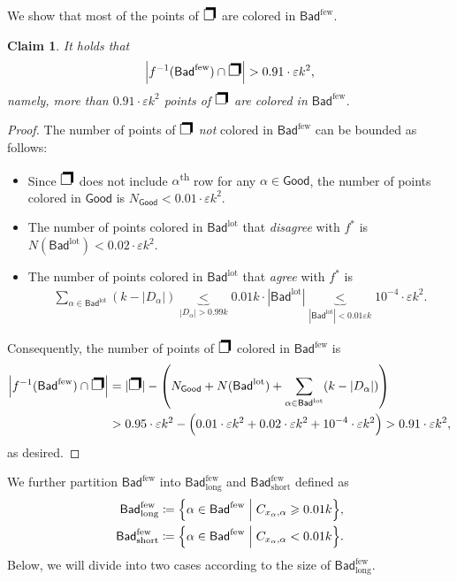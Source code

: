\documentclass[11pt,fleqn]{article}
\renewcommand{\geq}{\geqslant}
\renewcommand{\epsilon}{\varepsilon}
\newcommand{\nth}[1]{#1\textsuperscript{th}\xspace}
\newcommand{\defeq}{\coloneq}
\newcommand{\f}{f}
\newcommand{\Good}{\mathsf{Good}}
\newcommand{\Bad}{\mathsf{Bad}}
\newcommand{\Badgtr}{\Bad^\mathrm{lot}}
\newcommand{\Badlss}{\Bad^\mathrm{few}}
\newcommand{\BadlssL}{\Badlss_\mathrm{long}}
\newcommand{\BadlssS}{\Badlss_\mathrm{short}}
\newcommand{\SQ}{\text{{\Large\ding{112}}}}
\newtheorem{claim}[theorem]{Claim}
\theoremstyle{definition}
\numberwithin{equation}{section}
\begin{document}
We show that most of the points of $\SQ$ are colored in $\Badlss$.


\begin{claim}
\label{clm:Cut-hard:stripe:far:222-aux}
It holds that
\begin{align}
    \Bigl| \f^{-1}(\Badlss) \cap \SQ \Bigr| > 0.91 \cdot \epsilon k^2,
\end{align}
namely, more than $0.91 \cdot \epsilon k^2$ points of $\SQ$ are colored in $\Badlss$.
\end{claim}
\begin{proof}
The number of points of $\SQ$ \emph{not} colored in $\Badlss$ can be bounded as follows:
\begin{itemize}
    \item Since $\SQ$ does not include \nth{$\alpha$} row for any $\alpha \in \Good$,
    the number of points colored in $\Good$ is
    $N_\Good < 0.01 \cdot \epsilon k^2$.
    \item The number of points colored in $\Badgtr$ that \emph{disagree} with $\f^*$ is
    $N(\Badgtr) < 0.02 \cdot \epsilon k^2$.
    \item The number of points colored in $\Badgtr$ that \emph{agree} with $\f^*$ is
    \begin{align}
        \sum_{\alpha \in \Badgtr} (k-|D_\alpha|)
        \underbrace{<}_{|D_\alpha| > 0.99k} 0.01k \cdot |\Badgtr|
        \underbrace{<}_{|\Badgtr| < 0.01\epsilon k} 10^{-4} \cdot \epsilon k^2.
    \end{align}
\end{itemize}
Consequently, the number of points of $\SQ$ colored in $\Badlss$ is
\begin{align}
\begin{aligned}
    \Bigl| \f^{-1}(\Badlss) \cap \SQ \Bigr| &
    = |\SQ| - \left(N_\Good + N(\Badgtr) + \sum_{\alpha \in \Badgtr} (k-|D_\alpha|) \right) \\
    & > 0.95 \cdot \epsilon k^2
        - \Bigl(0.01 \cdot \epsilon k^2 + 0.02 \cdot \epsilon k^2 + 10^{-4} \cdot \epsilon k^2\Bigr)
    > 0.91 \cdot \epsilon k^2,
\end{aligned}
\end{align}
as desired.
\end{proof}


We further partition $\Badlss$ into  $\BadlssL$ and $\BadlssS$ defined as
\begin{align}
\begin{aligned}
    \BadlssL & \defeq \Bigl\{ \alpha \in \Badlss \Bigm| C_{x_\alpha, \alpha} \geq 0.01k \Bigr\}, \\
    \BadlssS & \defeq \Bigl\{ \alpha \in \Badlss \Bigm| C_{x_\alpha, \alpha} < 0.01k \Bigr\}.
\end{aligned}
\end{align}
Below, we will divide into two cases according to the size of $\BadlssL$.
\end{document}
